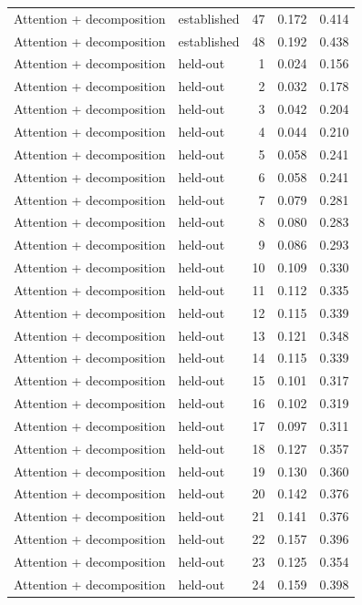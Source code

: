 \begin{tabular}{llrrr}
Attention + decomposition & established & 47 & 0.172 & 0.414 \\
Attention + decomposition & established & 48 & 0.192 & 0.438 \\
Attention + decomposition & held-out & 1 & 0.024 & 0.156 \\
Attention + decomposition & held-out & 2 & 0.032 & 0.178 \\
Attention + decomposition & held-out & 3 & 0.042 & 0.204 \\
Attention + decomposition & held-out & 4 & 0.044 & 0.210 \\
Attention + decomposition & held-out & 5 & 0.058 & 0.241 \\
Attention + decomposition & held-out & 6 & 0.058 & 0.241 \\
Attention + decomposition & held-out & 7 & 0.079 & 0.281 \\
Attention + decomposition & held-out & 8 & 0.080 & 0.283 \\
Attention + decomposition & held-out & 9 & 0.086 & 0.293 \\
Attention + decomposition & held-out & 10 & 0.109 & 0.330 \\
Attention + decomposition & held-out & 11 & 0.112 & 0.335 \\
Attention + decomposition & held-out & 12 & 0.115 & 0.339 \\
Attention + decomposition & held-out & 13 & 0.121 & 0.348 \\
Attention + decomposition & held-out & 14 & 0.115 & 0.339 \\
Attention + decomposition & held-out & 15 & 0.101 & 0.317 \\
Attention + decomposition & held-out & 16 & 0.102 & 0.319 \\
Attention + decomposition & held-out & 17 & 0.097 & 0.311 \\
Attention + decomposition & held-out & 18 & 0.127 & 0.357 \\
Attention + decomposition & held-out & 19 & 0.130 & 0.360 \\
Attention + decomposition & held-out & 20 & 0.142 & 0.376 \\
Attention + decomposition & held-out & 21 & 0.141 & 0.376 \\
Attention + decomposition & held-out & 22 & 0.157 & 0.396 \\
Attention + decomposition & held-out & 23 & 0.125 & 0.354 \\
Attention + decomposition & held-out & 24 & 0.159 & 0.398 \\

\end{tabular}

